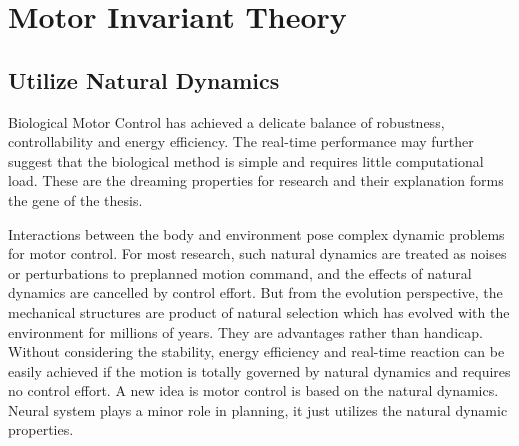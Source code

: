 %

\section{Motor Invariant Theory}
\subsection{Utilize Natural Dynamics}
Biological Motor Control has achieved a delicate balance of robustness, controllability and energy efficiency.
The real-time performance may further suggest that the biological method  is simple and requires little computational load.
These are the dreaming properties for \cms research and  their explanation  forms the gene of the thesis.



Interactions between the body and environment pose  complex dynamic problems for motor control.
For most \cms research, such natural dynamics are treated as noises or perturbations to preplanned motion command, and the  effects  of natural dynamics are cancelled by control effort.
But from the evolution perspective, the mechanical structures are product of natural selection which has evolved with the environment for millions of years. 
They are advantages rather than handicap. 
Without considering the stability, energy efficiency and real-time reaction can be easily achieved if the motion is totally governed by natural dynamics and requires no control effort.
A new idea is motor control is based on the natural dynamics.
Neural system plays a minor role in planning, it just utilizes the natural dynamic properties.


